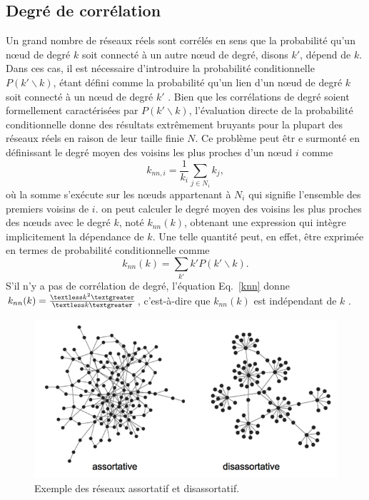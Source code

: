 \subsection{Degré de corrélation} 
Un grand nombre de réseaux réels sont corrélés en sens que la probabilité qu'un nœud de degré $k$ soit connecté à un autre
nœud de degré, disons $k'$, dépend de $k$. Dans ces cas, il est nécessaire d'introduire la probabilité conditionnelle 
$P(k'\backslash k)$, étant défini comme la probabilité qu'un lien d'un nœud de degré $k$ soit connecté à un nœud de degré 
$k'$ \cite{BP2002}. Bien que les corrélations de degré soient formellement caractérisées par $P(k'\backslash k)$, l'évaluation
directe de la probabilité conditionnelle donne des résultats extrêmement bruyants pour la plupart des réseaux réels en raison
de leur taille finie $N$. Ce problème peut êtr e surmonté en définissant le degré moyen des voisins les plus proches d'un nœud $i$
comme
\begin{equation}
 k_{nn,i}=\frac{1}{k_i}\sum_{j\in N_i}k_j,
\end{equation}
où la somme s'exécute sur les nœuds appartenant à $N_i$ qui signifie l'ensemble des premiers voisins de $i$. on peut calculer le degré 
moyen des voisins les plus proches des nœuds avec le degré $k$, noté $k_{nn}(k)$, obtenant une expression qui intègre implicitement
la dépendance de $k$. Une telle quantité peut, en effet, être exprimée en termes de probabilité conditionnelle comme
\begin{equation}
 k_{nn}(k)=\sum_{k'}k'P(k'\backslash k).
 \label{knn}
\end{equation}
S'il n'y a pas de corrélation de degré, l'équation Eq.~\eqref{knn} donne
$k_{nn}(k)=\frac{\textless k^2\textgreater}{\textless k\textgreater}$, c'est-à-dire que $k_{nn}(k)$ est indépendant de $k$
\cite{Bo-al2006}.\\
\begin{figure}[h!]
	\centering
	\includegraphics[scale=0.6]{./figures/assortative_disassortative}
	\caption{Exemple des réseaux assortatif et disassortatif.}
	\label{assortative_disassortative}
\end{figure}
\label{s-correl}

